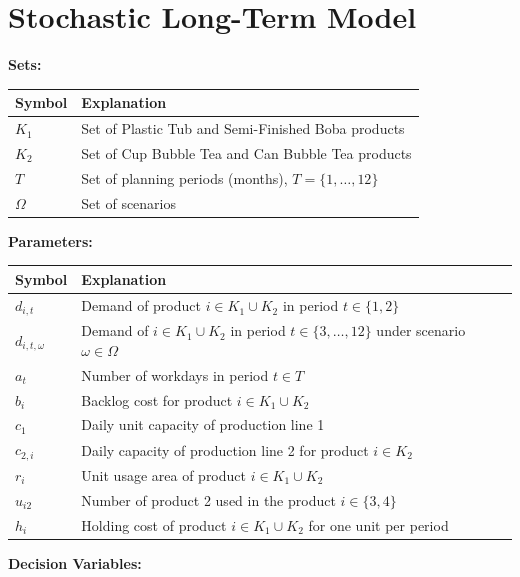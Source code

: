 \documentclass[nocoverpage]{buIE47xbooklet}
\begin{document}
\section{Stochastic Long-Term Model}
\label{app:A} 
{\footnotesize
\noindent\textbf{Sets:}

\vspace{0.5em}
\noindent\begin{tabular}{p{}p{}}\toprule
\textbf{Symbol} & \textbf{Explanation} \\ \midrule
$K_1$ & Set of Plastic Tub and Semi-Finished Boba products \\
$K_2$ & Set of Cup Bubble Tea and Can Bubble Tea products \\
$T$ & Set of planning periods (months), $T=\{1,\dots,12\}$ \\
$\Omega$ & Set of scenarios \\ \bottomrule
\end{tabular}
\vspace{0.8em}

\noindent\textbf{Parameters:}

\vspace{0.5em}
\noindent\begin{tabular}{p{}p{}}\toprule
\textbf{Symbol} & \textbf{Explanation} \\ \midrule
$d_{i,t}$ & Demand of product $i\in K_1 \cup K_2$ in period $t \in \{1,2\}$ \\
$d_{i,t,\omega}$ & Demand of $i\in K_1 \cup K_2$ in period $t \in \{3,\dots,12\}$ under scenario $\omega \in \Omega$ \\
$a_t$ & Number of workdays in period $t \in T$ \\
$b_i$ & Backlog cost for product $i \in K_1 \cup K_2 $ \\
$c_1$ & Daily unit capacity of production line 1 \\
$c_{2,i}$ & Daily capacity of production line 2 for product $i \in K_2$ \\
$r_i$ & Unit usage area of product $i\in K_1 \cup K_2$ \\
$u_{i2}$ & Number of product 2 used in the product $i \in \{3,4\}$ \\
$h_i$ & Holding cost of product $i\in K_1 \cup K_2$ for one unit per period \\ \bottomrule
\end{tabular}

\vspace{0.8em}
\noindent\textbf{Decision Variables:}

}
\end{document}
